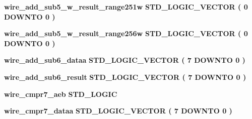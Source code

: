 \begin{DoxyCompactItemize}
{\bf wire\+\_\+add\+\_\+sub5\+\_\+w\+\_\+result\+\_\+range251w} {\bfseries \textcolor{comment}{S\+T\+D\+\_\+\+L\+O\+G\+I\+C\+\_\+\+V\+E\+C\+T\+OR}\textcolor{vhdlchar}{ }\textcolor{vhdlchar}{(}\textcolor{vhdlchar}{ }\textcolor{vhdlchar}{ } \textcolor{vhdldigit}{0} \textcolor{vhdlchar}{ }\textcolor{keywordflow}{D\+O\+W\+N\+TO}\textcolor{vhdlchar}{ }\textcolor{vhdlchar}{ } \textcolor{vhdldigit}{0} \textcolor{vhdlchar}{ }\textcolor{vhdlchar}{)}\textcolor{vhdlchar}{ }} 
\item 
{\bf wire\+\_\+add\+\_\+sub5\+\_\+w\+\_\+result\+\_\+range256w} {\bfseries \textcolor{comment}{S\+T\+D\+\_\+\+L\+O\+G\+I\+C\+\_\+\+V\+E\+C\+T\+OR}\textcolor{vhdlchar}{ }\textcolor{vhdlchar}{(}\textcolor{vhdlchar}{ }\textcolor{vhdlchar}{ } \textcolor{vhdldigit}{0} \textcolor{vhdlchar}{ }\textcolor{keywordflow}{D\+O\+W\+N\+TO}\textcolor{vhdlchar}{ }\textcolor{vhdlchar}{ } \textcolor{vhdldigit}{0} \textcolor{vhdlchar}{ }\textcolor{vhdlchar}{)}\textcolor{vhdlchar}{ }} 
\item 
{\bf wire\+\_\+add\+\_\+sub6\+\_\+dataa} {\bfseries \textcolor{comment}{S\+T\+D\+\_\+\+L\+O\+G\+I\+C\+\_\+\+V\+E\+C\+T\+OR}\textcolor{vhdlchar}{ }\textcolor{vhdlchar}{(}\textcolor{vhdlchar}{ }\textcolor{vhdlchar}{ } \textcolor{vhdldigit}{7} \textcolor{vhdlchar}{ }\textcolor{keywordflow}{D\+O\+W\+N\+TO}\textcolor{vhdlchar}{ }\textcolor{vhdlchar}{ } \textcolor{vhdldigit}{0} \textcolor{vhdlchar}{ }\textcolor{vhdlchar}{)}\textcolor{vhdlchar}{ }} 
\item 
{\bf wire\+\_\+add\+\_\+sub6\+\_\+result} {\bfseries \textcolor{comment}{S\+T\+D\+\_\+\+L\+O\+G\+I\+C\+\_\+\+V\+E\+C\+T\+OR}\textcolor{vhdlchar}{ }\textcolor{vhdlchar}{(}\textcolor{vhdlchar}{ }\textcolor{vhdlchar}{ } \textcolor{vhdldigit}{7} \textcolor{vhdlchar}{ }\textcolor{keywordflow}{D\+O\+W\+N\+TO}\textcolor{vhdlchar}{ }\textcolor{vhdlchar}{ } \textcolor{vhdldigit}{0} \textcolor{vhdlchar}{ }\textcolor{vhdlchar}{)}\textcolor{vhdlchar}{ }} 
\item 
{\bf wire\+\_\+cmpr7\+\_\+aeb} {\bfseries \textcolor{comment}{S\+T\+D\+\_\+\+L\+O\+G\+IC}\textcolor{vhdlchar}{ }} 
\item 
{\bf wire\+\_\+cmpr7\+\_\+dataa} {\bfseries \textcolor{comment}{S\+T\+D\+\_\+\+L\+O\+G\+I\+C\+\_\+\+V\+E\+C\+T\+OR}\textcolor{vhdlchar}{ }\textcolor{vhdlchar}{(}\textcolor{vhdlchar}{ }\textcolor{vhdlchar}{ } \textcolor{vhdldigit}{7} \textcolor{vhdlchar}{ }\textcolor{keywordflow}{D\+O\+W\+N\+TO}\textcolor{vhdlchar}{ }\textcolor{vhdlchar}{ } \textcolor{vhdldigit}{0} \textcolor{vhdlchar}{ }\textcolor{vhdlchar}{)}\textcolor{vhdlchar}{ }} 

\end{DoxyCompactItemize}
